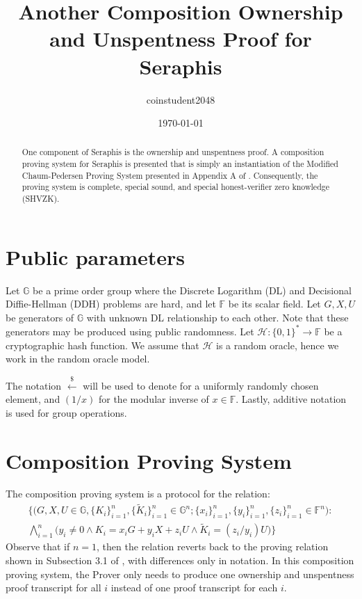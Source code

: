 \documentclass{article}
\title{Another Composition Ownership and Unspentness Proof for Seraphis}
\author{coinstudent2048}
\date{\today}
\begin{document}
\maketitle

\begin{abstract}
One component of Seraphis \cite{seraphis, seraphis2} is the ownership and unspentness proof. A composition proving system for Seraphis is presented that is simply an instantiation of the Modified Chaum-Pedersen Proving System presented in Appendix A of \cite{lelantus-spark}. Consequently, the proving system is complete, special sound, and special honest-verifier zero knowledge (SHVZK).
\end{abstract}

\section{Public parameters}
Let $\mathbb{G}$ be a prime order group where the Discrete Logarithm (DL) and Decisional Diffie-Hellman (DDH) problems are hard, and let $\mathbb{F}$ be its scalar field. Let $G, X, U$ be generators of $\mathbb{G}$ with unknown DL relationship to each other. Note that these generators may be produced using public randomness. Let $\mathcal{H}:\{0,1\}^*\rightarrow\mathbb{F}$ be a cryptographic hash function. We assume that $\mathcal{H}$ is a random oracle, hence we work in the random oracle model.

The notation $\xleftarrow{\$}$ will be used to denote for a uniformly randomly chosen element, and $(1/x)$ for the modular inverse of $x\in\mathbb{F}$. Lastly, additive notation is used for group operations.


\section{Composition Proving System}
The composition proving system is a protocol for the relation:
\begin{multline*}
\Big\{\big(G, X, U\in\mathbb{G}, \{K_i\}_{i=1}^n, \{\tilde{K}_i\}_{i=1}^n \in\mathbb{G}^n; \{x_i\}_{i=1}^n, \{y_i\}_{i=1}^n, \{z_i\}_{i=1}^n \in\mathbb{F}^n\big): \\ \bigwedge_{i=1}^n{\big(y_i \ne 0 \wedge K_i = x_i G + y_i X + z_i U \wedge \tilde{K}_i = (z_i/y_i)U\big)} \Big\}
\end{multline*}
Observe that if $n = 1$, then the relation reverts back to the proving relation shown in Subsection 3.1 of \cite{seraphis2}, with differences only in notation. In this composition proving system, the Prover only needs to produce one ownership and unspentness proof transcript for all $i$ instead of one proof transcript for each $i$.
\end{document}
